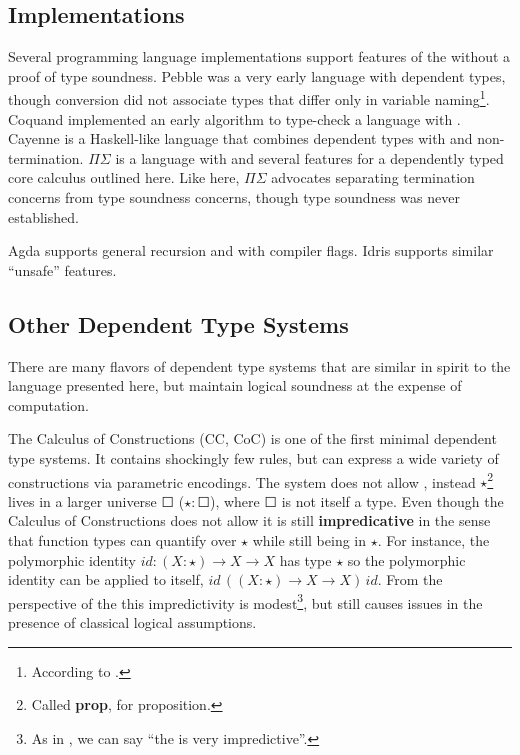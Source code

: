 \subsection{Implementations}
 
Several programming language implementations support features of the \slang{} without a proof of type soundness.
Pebble\cite{10.1007/3-540-13346-1_1} was a very early language with dependent types, though conversion did not associate types that differ only in variable naming\footnote{
  According to \cite{Reinhold89typecheckingis}.
}.
Coquand implemented an early \bidir{} algorithm to type-check a language with \tit{}\cite{COQUAND1996167}.
Cayenne\cite{10.1145/289423.289451} is a Haskell-like language that combines dependent types with \tit{} and non-termination.
$\Pi\Sigma$\cite{10.1007/978-3-642-12251-4_5} is a language with \tit{} and several features for a dependently typed core calculus outlined here.
Like here, $\Pi$$\Sigma$ advocates separating termination concerns from type soundness concerns, though type soundness was never established.
 
Agda supports general recursion and \tit{} with compiler flags.
Idris supports similar ``unsafe'' features.
 
\subsection{Other Dependent Type Systems}
 
There are many flavors of dependent type systems that are similar in spirit to the language presented here, but maintain logical soundness at the expense of computation.
 
The Calculus of Constructions (\ac{CC}, CoC)\cite{10.1016/0890-5401(88)90005-3} is one of the first minimal dependent type systems.
It contains shockingly few rules, but can express a wide variety of constructions via parametric encodings.
The system does not allow \tit{}, instead $\star$\footnote{
  Called \textbf{prop}, for proposition.
} lives in a larger universe  $\Square$ ($\star:\Square$), where $\Square$ is not itself a type.
Even though the Calculus of Constructions does not allow \tit{} it is still \textbf{impredicative} in the sense that function types can quantify over $\star$ while still being in $\star$.
For instance, the polymorphic identity $id:(X:\star)\rightarrow X\rightarrow X$ has type $\star$ so the polymorphic identity can be applied to itself, $id\,\left((X:\star)\rightarrow X\rightarrow X\right)\,id$.
From the perspective of the \slang{} this impredictivity is modest\footnote{
  As in \cite{10.1007/978-3-642-12251-4_5}, we can say ``the \slang{} is very impredictive''. 
}, but still causes issues in the presence of classical logical assumptions. 
 
